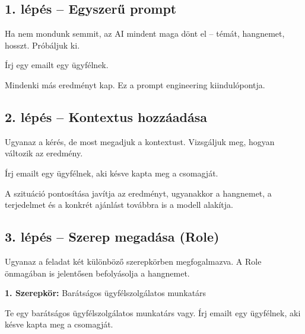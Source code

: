 \documentclass[11pt,a4paper]{article}
\newcommand{\warn}[1]{%
  \vspace{3pt}%
  \begin{tcolorbox}[warnstyle]%
  \textbf{\textcolor{warnborder}{Figyelem:}} #1%
  \end{tcolorbox}\vspace{2pt}}
\begin{document}
\bigskip

\subsection{1. lépés -- Egyszerű prompt}

\noindent Ha nem mondunk semmit, az AI mindent maga dönt el -- témát, hangnemet, hosszt. Próbáljuk ki.

\begin{prompt}
Írj egy emailt egy ügyfélnek.
\end{prompt}

\noindent Mindenki más eredményt kap. Ez a prompt engineering kiindulópontja.


\subsection{2. lépés -- Kontextus hozzáadása}

\noindent Ugyanaz a kérés, de most megadjuk a kontextust. Vizsgáljuk meg, hogyan változik az eredmény.

\begin{prompt}
Írj emailt egy ügyfélnek, aki késve kapta meg a csomagját.
\end{prompt}

\noindent A szituáció pontosítása javítja az eredményt, ugyanakkor a hangnemet, a terjedelmet és a konkrét ajánlást továbbra is a modell alakítja.

\subsection{3. lépés -- Szerep megadása (Role)}

\noindent Ugyanaz a feladat két különböző szerepkörben megfogalmazva. A Role önmagában is jelentősen befolyásolja a hangnemet.

\medskip\noindent\textbf{1. Szerepkör:} Barátságos ügyfélszolgálatos munkatárs

\begin{prompt}
Te egy barátságos ügyfélszolgálatos munkatárs vagy.
Írj emailt egy ügyfélnek, aki késve kapta meg a csomagját.
\end{prompt}
\end{document}
